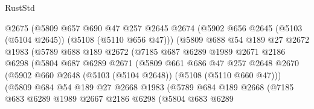 \begin{lexlean}{RustStd}
\begin{coremodule}
                        @2675
                        (@5809
                          @657
                          @690
                          @47
                          @257
                          @2645
                          @2674
                          (@5902 @656 @2645 (@5103 (@5104 @2645)) (@5108 (@5110 @656 @47)))
                          (@5809
                            @688
                            @54
                            @189
                            @27
                            @2672
                            @1983
                            (@5789
                              @688
                              @189
                              @2672
                              (@7185
                                @687
                                @6289
                                @1989
                                @2671
                                @2186
                                @6298
                                (@5804
                                  @687
                                  @6289
                                  @2671
                                  (@5809
                                    @661
                                    @686
                                    @47
                                    @257
                                    @2648
                                    @2670
                                    (@5902
                                      @660
                                      @2648
                                      (@5103 (@5104 @2648))
                                      (@5108 (@5110 @660 @47)))
                                    (@5809
                                      @684
                                      @54
                                      @189
                                      @27
                                      @2668
                                      @1983
                                      (@5789
                                        @684
                                        @189
                                        @2668
                                        (@7185
                                          @683
                                          @6289
                                          @1989
                                          @2667
                                          @2186
                                          @6298
                                          (@5804
                                            @683
                                            @6289

\end{coremodule}
\end{lexlean}
